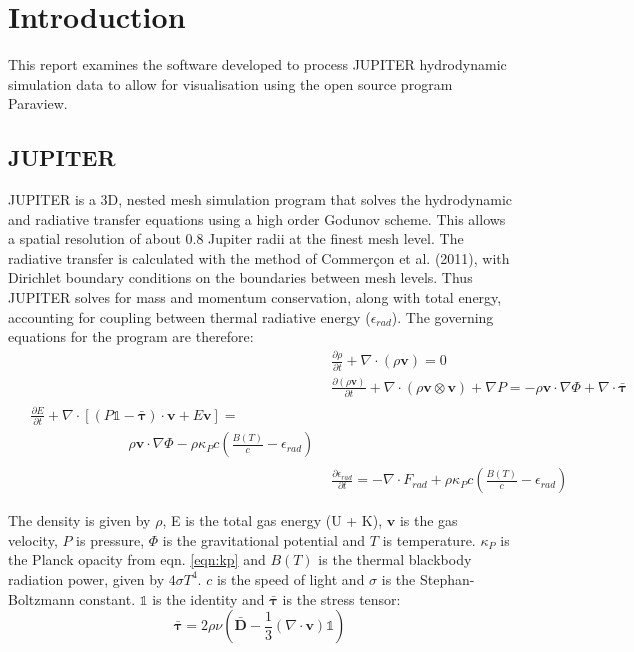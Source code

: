 \documentclass[twocolumn]{aastex62}
\begin{document}
\section{Introduction} \label{sec:intro}
This report examines the software developed to process JUPITER hydrodynamic simulation data to allow for visualisation using the open source program Paraview.

\subsection{JUPITER}\label{sec:jup}
JUPITER is a 3D, nested mesh simulation program that solves the hydrodynamic and radiative transfer equations using a high order Godunov scheme. This allows a spatial resolution of about 0.8 Jupiter radii at the finest mesh level. 
The radiative transfer is calculated with the method of Commer\c{c}on et al. (2011), with Dirichlet boundary conditions on the boundaries between mesh levels.
Thus JUPITER solves for mass and momentum conservation, along with total energy, accounting for coupling between thermal  radiative energy ($\epsilon_{rad}$). The governing equations for the program are therefore:
\begin{align}\label{eqns:hydro}
&\frac{\partial\rho}{\partial t} + \nabla \cdot \left(\rho\mathbf{v}\right) = 0\\
&\frac{\partial\left(\rho\mathbf{v}\right)}{\partial t} + \nabla \cdot \left(\rho\mathbf{v} \otimes \mathbf{v}\right) + \nabla P = -\rho\mathbf{v}\cdot\nabla\Phi + \nabla \cdot \bm{\bar{\tau}}\\
\begin{split}
&\frac{\partial E}{\partial t} + \nabla\cdot\left[\left(P \mathds{1}- \bm{\bar{\tau}} \right) \cdot \mathbf{v} + E\mathbf{v}\right] = \\&\qquad\qquad\qquad\quad\rho \mathbf{v}\cdot\nabla\Phi - \rho\kappa_{P}c\left(\frac{B\left(T\right)}{c} - \epsilon_{rad}\right)
\end{split}\\
&\frac{\partial \epsilon_{rad}}{\partial t} = -\nabla \cdot F_{rad} + \rho\kappa_{P}c\left(\frac{B\left(T\right)}{c} - \epsilon_{rad}\right)
\end{align}

The density is given by $\rho$, E is the total gas energy (U + K), $\mathbf{v}$ is the gas velocity, $P$ is pressure, $\Phi$ is the gravitational potential and $T$ is temperature. $\kappa_{P}$ is the Planck opacity from eqn. \ref{eqn:kp} and $B(T)$ is the thermal blackbody radiation power, given by $4\sigma T^{4}$. $c$ is the speed of light and $\sigma$ is the Stephan-Boltzmann constant. $\mathds{1}$ is the identity and $\bm{\bar{\tau}}$ is the stress tensor:
\begin{equation}
\bm{\bar{\tau}} = 2\rho\nu\left(\bm{\bar{D}} - \frac{1}{3}\left(\nabla\cdot\mathbf{v}\right)\mathds{1}\right)
\end{equation}
\end{document}
